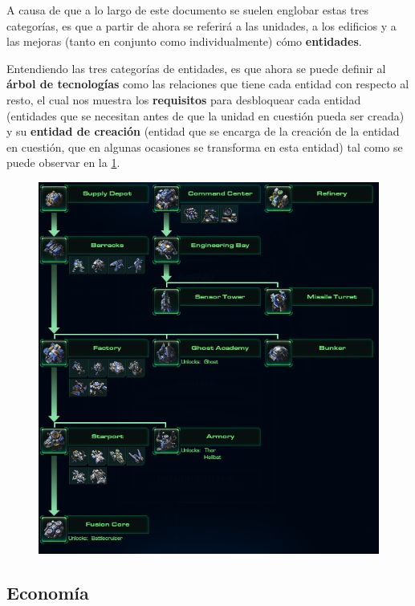A causa de que a lo largo de este documento se suelen englobar estas tres categorías, es que a partir de ahora se referirá a las unidades, a los edificios y a las mejoras (tanto en conjunto como individualmente) cómo \textbf{entidades}.

Entendiendo las tres categorías de entidades, es que ahora se puede definir al \textbf{árbol de tecnologías} como las relaciones que tiene cada entidad con respecto al resto, el cual nos muestra los \textbf{requisitos} para desbloquear cada entidad (entidades que se necesitan antes de que la unidad en cuestión pueda ser creada) y su \textbf{entidad de creación} (entidad que se encarga de la creación de la entidad en cuestión, que en algunas ocasiones se transforma en esta entidad) tal como se puede observar en la {\ref{fig:2}}.

\begin{figure}[H]
	\centering
	\captionsetup{justification=centering}
	\includegraphics[keepaspectratio]{images/2.png}
	\label{fig:2}
\end{figure}

\subsection{Economía}

